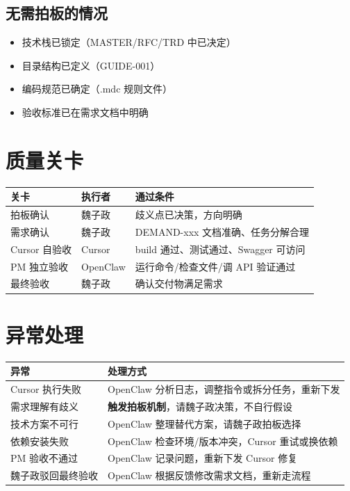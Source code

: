 \documentclass[11pt,a4paper]{article}
\begin{document}
\subsection{无需拍板的情况}

\begin{itemize}[nosep]
  \item 技术栈已锁定（MASTER/RFC/TRD 中已决定）
  \item 目录结构已定义（GUIDE-001）
  \item 编码规范已确定（.mdc 规则文件）
  \item 验收标准已在需求文档中明确
\end{itemize}

\section{质量关卡}

\begin{table}[h]
\centering
\begin{tabularx}{\linewidth}{llX}
\toprule
\textbf{关卡} & \textbf{执行者} & \textbf{通过条件} \\
\midrule
拍板确认 & 魏子政 & 歧义点已决策，方向明确 \\
需求确认 & 魏子政 & DEMAND-xxx 文档准确、任务分解合理 \\
Cursor 自验收 & Cursor & build 通过、测试通过、Swagger 可访问 \\
PM 独立验收 & OpenClaw & 运行命令/检查文件/调 API 验证通过 \\
最终验收 & 魏子政 & 确认交付物满足需求 \\
\bottomrule
\end{tabularx}
\end{table}

\section{异常处理}

\begin{table}[h]
\centering
\begin{tabularx}{\linewidth}{lX}
\toprule
\textbf{异常} & \textbf{处理方式} \\
\midrule
Cursor 执行失败 & OpenClaw 分析日志，调整指令或拆分任务，重新下发 \\
需求理解有歧义 & \textbf{触发拍板机制}，请魏子政决策，不自行假设 \\
技术方案不可行 & OpenClaw 整理替代方案，请魏子政拍板选择 \\
依赖安装失败 & OpenClaw 检查环境/版本冲突，Cursor 重试或换依赖 \\
PM 验收不通过 & OpenClaw 记录问题，重新下发 Cursor 修复 \\
魏子政驳回最终验收 & OpenClaw 根据反馈修改需求文档，重新走流程 \\
\bottomrule
\end{tabularx}
\end{table}
\end{document}
